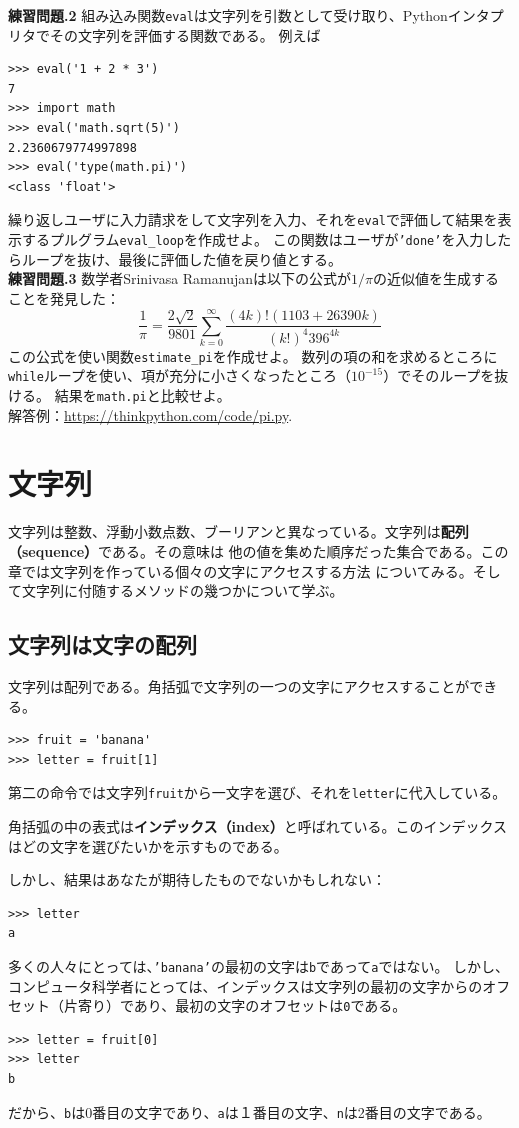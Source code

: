 \documentclass[a4j,12pt,makeidx]{jbook}
\newcommand{\tp}{\thechapter}
\begin{document}
\noindent
{\bf 練習問題\tp.2} 組み込み関数{\tt eval}は文字列を引数として受け取り、Pythonインタプリタでその文字列を評価する関数である。
例えば
\begin{verbatim}
>>> eval('1 + 2 * 3')
7
>>> import math
>>> eval('math.sqrt(5)')
2.2360679774997898
>>> eval('type(math.pi)')
<class 'float'>
\end{verbatim}
繰り返しユーザに入力請求をして文字列を入力、それを{\tt eval}で評価して結果を表示するプルグラム{\tt eval\_loop}を作成せよ。
この関数はユーザが{\tt 'done'}を入力したらループを抜け、最後に評価した値を戻り値とする。\\

\noindent
{\bf 練習問題\tp.3} 数学者Srinivasa Ramanujanは以下の公式が$1/\pi$の近似値を生成することを発見した：
 \[ \frac{1}{\pi} = \frac{2\sqrt{2}}{9801} 
\sum^\infty_{k=0} \frac{(4k)!(1103+26390k)}{(k!)^4 396^{4k}} \]
この公式を使い関数{\tt estimate\_pi}を作成せよ。
数列の項の和を求めるところに{\tt while}ループを使い、項が充分に小さくなったところ（$10^{-15}$）でそのループを抜ける。
結果を{\tt math.pi}と比較せよ。\\
解答例：\url{https://thinkpython.com/code/pi.py}.
%
\chapter{文字列}
文字列は整数、浮動小数点数、ブーリアンと異なっている。文字列は{\bf 配列（sequence）}である。その意味は
他の値を集めた順序だった集合である。この章では文字列を作っている個々の文字にアクセスする方法
についてみる。そして文字列に付随するメソッドの幾つかについて学ぶ。
%
\section{文字列は文字の配列}
文字列は配列である。角括弧で文字列の一つの文字にアクセスすることができる。
\begin{verbatim}
>>> fruit = 'banana'
>>> letter = fruit[1]
\end{verbatim}
第二の命令では文字列{\tt fruit}から一文字を選び、それを{\tt letter}に代入している。\par
角括弧の中の表式は{\bf インデックス（index）}と呼ばれている。このインデックスはどの文字を選びたいかを示すものである。 \par
しかし、結果はあなたが期待したものでないかもしれない：
\begin{verbatim}
>>> letter
a
\end{verbatim}
多くの人々にとっては、{\tt 'banana'}の最初の文字は{\tt b}であって{\tt a}ではない。
しかし、コンピュータ科学者にとっては、インデックスは文字列の最初の文字からのオフセット（片寄り）であり、最初の文字のオフセットは{\tt 0}である。
\begin{verbatim}
>>> letter = fruit[0]
>>> letter
b
\end{verbatim}
だから、{\tt b}は0番目の文字であり、{\tt a}は１番目の文字、{\tt n}は2番目の文字である。\par
\end{document}
